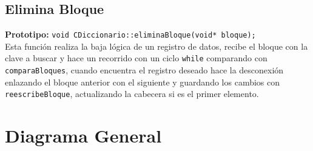 \documentclass[12pt]{article}
\begin{document}
{}
\subsection*{Elimina Bloque}
\textbf{Prototipo:} \verb|void CDiccionario::eliminaBloque(void* bloque);|\\
Esta función realiza la baja lógica de un registro de datos, recibe el 
bloque con la clave a buscar y hace un recorrido con un ciclo \verb|while| 
comparando con \verb|comparaBloques|, cuando encuentra el registro deseado 
hace la desconexión enlazando el bloque anterior con el siguiente y guardando 
los cambios con \verb|reescribeBloque|, actualizando la cabecera si es el 
primer elemento.

\newpage
\section{Diagrama General}
\end{document}
